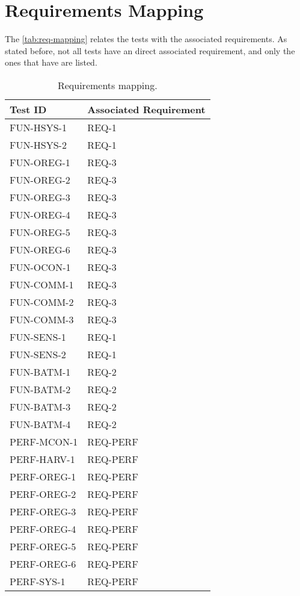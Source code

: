 \section{Requirements Mapping}

The \autoref{tab:req-mapping} relates the tests with the associated requirements.
As stated before, not all tests have an direct associated requirement, and only the ones that have are listed.



\begin{table}[htp]
    \small
    \centering
    \begin{tabular}{ll}
        \toprule
        \textbf{Test ID}    & \textbf{Associated Requirement}   \\
        \midrule
        \midrule
            FUN-HSYS-1      & REQ-1      \\
            FUN-HSYS-2      & REQ-1      \\
            FUN-OREG-1      & REQ-3      \\
            FUN-OREG-2      & REQ-3      \\
            FUN-OREG-3      & REQ-3      \\
            FUN-OREG-4      & REQ-3      \\
            FUN-OREG-5      & REQ-3      \\
            FUN-OREG-6      & REQ-3      \\
            FUN-OCON-1      & REQ-3      \\
            FUN-COMM-1      & REQ-3      \\
            FUN-COMM-2      & REQ-3      \\
            FUN-COMM-3      & REQ-3      \\
            FUN-SENS-1      & REQ-1      \\
            FUN-SENS-2      & REQ-1      \\
            FUN-BATM-1      & REQ-2      \\
            FUN-BATM-2      & REQ-2      \\
            FUN-BATM-3      & REQ-2      \\
            FUN-BATM-4      & REQ-2      \\
            PERF-MCON-1     & REQ-PERF      \\
            PERF-HARV-1     & REQ-PERF      \\
            PERF-OREG-1     & REQ-PERF      \\
            PERF-OREG-2     & REQ-PERF      \\
            PERF-OREG-3     & REQ-PERF      \\
            PERF-OREG-4     & REQ-PERF      \\
            PERF-OREG-5     & REQ-PERF      \\
            PERF-OREG-6     & REQ-PERF      \\
            PERF-SYS-1      & REQ-PERF      \\
        \bottomrule
    \end{tabular}
    \caption{Requirements mapping.}
    \label{tab:req-mapping}
\end{table}